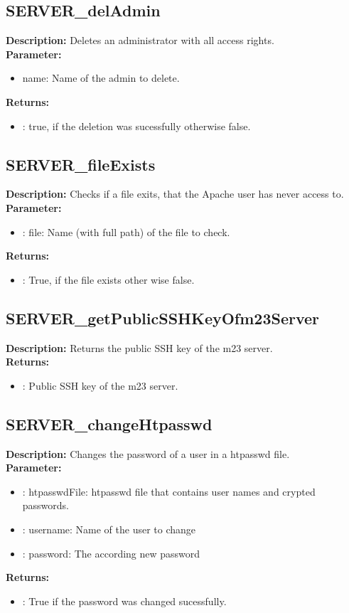 \subsection{SERVER\_delAdmin}
\textbf{Description:} Deletes an administrator with all access rights.\\
\textbf{Parameter:}
\begin{itemize}
\item name: Name of the admin to delete.
\end{itemize}
\textbf{Returns:}
\begin{itemize}
\item : true, if the deletion was sucessfully otherwise false.
\end{itemize}

\subsection{SERVER\_fileExists}
\textbf{Description:} Checks if a file exits, that the Apache user has never access to.\\
\textbf{Parameter:}
\begin{itemize}
\item : file: Name (with full path) of the file to check.
\end{itemize}
\textbf{Returns:}
\begin{itemize}
\item : True, if the file exists other wise false.
\end{itemize}

\subsection{SERVER\_getPublicSSHKeyOfm23Server}
\textbf{Description:} Returns the public SSH key of the m23 server.\\
\textbf{Returns:}
\begin{itemize}
\item : Public SSH key of the m23 server.
\end{itemize}

\subsection{SERVER\_changeHtpasswd}
\textbf{Description:} Changes the password of a user in a htpasswd file.\\
\textbf{Parameter:}
\begin{itemize}
\item : htpasswdFile: htpasswd file that contains user names and crypted passwords.
\item : username: Name of the user to change
\item : password: The according new password
\end{itemize}
\textbf{Returns:}
\begin{itemize}
\item : True if the password was changed sucessfully.
\end{itemize}

